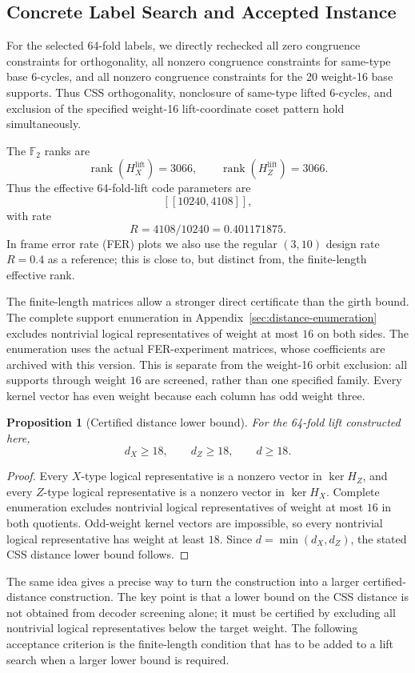 \documentclass[11pt,a4paper]{article}
\newcommand{\F}{\mathbb{F}}
\newcommand{\HX}{H_X}
\newcommand{\HZ}{H_Z}
\newcommand{\HXL}{H_X^{\mathrm{lift}}}
\newcommand{\HZL}{H_Z^{\mathrm{lift}}}
\newcommand{\rank}{\operatorname{rank}}
\newcommand{\kerop}{\operatorname{ker}}
\theoremstyle{uprighttheorem}
\newtheorem{proposition}{Proposition}
\begin{document}
\subsection{Concrete Label Search and Accepted Instance}

For the selected 64-fold labels, we directly rechecked all zero congruence constraints for orthogonality, all nonzero congruence constraints for same-type base 6-cycles, and all nonzero congruence constraints for the 20 weight-16 base supports.
Thus CSS orthogonality, nonclosure of same-type lifted 6-cycles, and exclusion of the specified weight-16 lift-coordinate coset pattern hold simultaneously.

The $\F_2$ ranks are
\[
  \rank(\HXL)=3066,
  \qquad
  \rank(\HZL)=3066.
\]
Thus the effective 64-fold-lift code parameters are
\[
  [[10240,4108]],
\]
with rate
\[
  R=4108/10240=0.401171875.
\]
In frame error rate (FER) plots we also use the regular $(3,10)$ design rate $R=0.4$ as a reference; this is close to, but distinct from, the finite-length effective rank.

The finite-length matrices allow a stronger direct certificate than the girth bound.
The complete support enumeration in Appendix~\ref{sec:distance-enumeration} excludes nontrivial logical representatives of weight at most $16$ on both sides.
The enumeration uses the actual FER-experiment matrices, whose coefficients are archived with this version.
This is separate from the weight-16 orbit exclusion: all supports through weight $16$ are screened, rather than one specified family.
Every kernel vector has even weight because each column has odd weight three.

\begin{proposition}[Certified distance lower bound]
For the 64-fold lift constructed here,
\[
  d_X \ge 18,
  \qquad
  d_Z \ge 18,
  \qquad
  d \ge 18.
\]
\end{proposition}

\begin{proof}
Every $X$-type logical representative is a nonzero vector in $\kerop \HZ$, and every $Z$-type logical representative is a nonzero vector in $\kerop \HX$.
Complete enumeration excludes nontrivial logical representatives of weight at most $16$ in both quotients. Odd-weight kernel vectors are impossible, so every nontrivial logical representative has weight at least $18$.
Since \(d=\min(d_X,d_Z)\), the stated CSS distance lower bound follows.
\end{proof}

The same idea gives a precise way to turn the construction into a larger certified-distance construction.
The key point is that a lower bound on the CSS distance is not obtained from decoder screening alone; it must be certified by excluding all nontrivial logical representatives below the target weight.
The following acceptance criterion is the finite-length condition that has to be added to a lift search when a larger lower bound is required.
\end{document}
